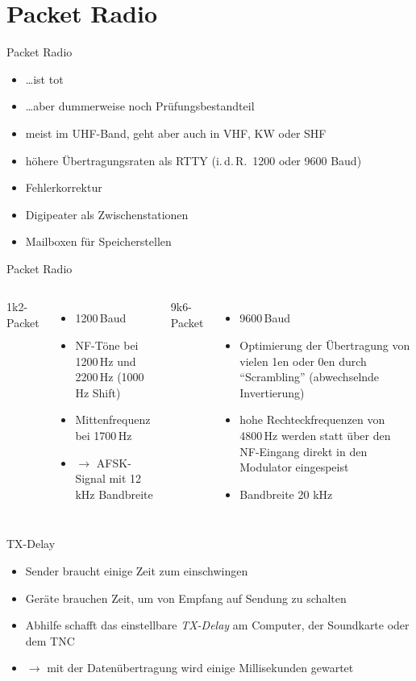 \section{Packet Radio}
\begin{frame}{Packet Radio}
  \begin{itemize}
    \item \ldots ist tot
    \item \ldots aber dummerweise noch Prüfungsbestandteil
    \item meist im UHF-Band, geht aber auch in VHF, KW oder SHF
    \item höhere Übertragungsraten als RTTY (i.\,d.\,R.\, 1200 oder 9600 Baud)
    \item Fehlerkorrektur
    \item Digipeater als Zwischenstationen
    \item Mailboxen für Speicherstellen
  \end{itemize}
\end{frame}

\begin{frame}{Packet Radio}
  \begin{columns}
    1k2-Packet
    \begin{itemize}
      \item 1200\,Baud
      \item NF-Töne bei 1200\,Hz und 2200\,Hz (1000\,Hz Shift)
      \item Mittenfrequenz bei 1700\,Hz
      \item $\rightarrow$ AFSK-Signal mit 12\,kHz Bandbreite
    \end{itemize}
    9k6-Packet
    \begin{itemize}
      \item 9600\,Baud
      \item Optimierung der Übertragung von vielen 1en oder 0en durch ``Scrambling'' (abwechselnde Invertierung)
      \item hohe Rechteckfrequenzen von 4800\,Hz werden statt über den NF-Eingang direkt in den Modulator eingespeist
      \item Bandbreite 20 kHz
    \end{itemize}
  \end{columns}
\end{frame}

\begin{frame}{TX-Delay}
  \begin{itemize}
    \item Sender braucht einige Zeit zum einschwingen
    \item Geräte brauchen Zeit, um von Empfang auf Sendung zu schalten
    \item Abhilfe schafft das einstellbare \emph{TX-Delay} am Computer, der Soundkarte oder dem TNC
    \item $\rightarrow$ mit der Datenübertragung wird einige Millisekunden gewartet
  \end{itemize}
\end{frame}

